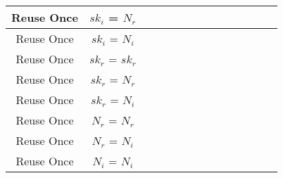 \documentclass[crop]{standalone}
\newcommand{\noattack}{\color{ForestGreen}\usym{2713}\color{black}}
\newcommand{\attack}{\color{red}\usym{2717}\color{black}}
\begin{document}
{\begin{tabular}{|c|c|c|c|c|c|c|c|c|c|c|c|c|c|}
Reuse Once & $sk_i$ = $N_r$ & \attack & \attack & \attack & \attack & \attack & \attack & \attack & \attack & \attack & \attack & \noattack & \noattack\\ \hline
Reuse Once & $sk_i$ = $N_i$ & \attack & \attack & \attack & \attack & \attack & \attack & \attack & \attack & \attack & \attack & \noattack & \noattack\\ \hline
Reuse Once & $sk_r$ = $sk_r$ & \noattack & \noattack & \noattack & \noattack & \noattack & \noattack & \noattack & \noattack & \noattack & \noattack & \noattack & \noattack\\ \hline
Reuse Once & $sk_r$ = $N_r$ & \attack & \attack & \attack & \attack & \attack & \attack & \attack & \attack & \attack & \attack & \noattack & \noattack\\ \hline
Reuse Once & $sk_r$ = $N_i$ & \attack & \attack & \attack & \attack & \attack & \attack & \attack & \attack & \attack & \attack & \noattack & \noattack\\ \hline
Reuse Once & $N_r$ = $N_r$ & \attack & \attack & \attack & \attack & \attack & \attack & \attack & \attack & \attack & \attack & \noattack & \noattack\\ \hline
Reuse Once & $N_r$ = $N_i$ & \attack & \attack & \attack & \attack & \attack & \attack & \attack & \attack & \attack & \attack & \noattack & \noattack\\ \hline
Reuse Once & $N_i$ = $N_i$ & \attack & \attack & \attack & \attack & \attack & \attack & \attack & \attack & \attack & \attack & \noattack & \noattack\\ \hline
\end{tabular}}
\end{document}
